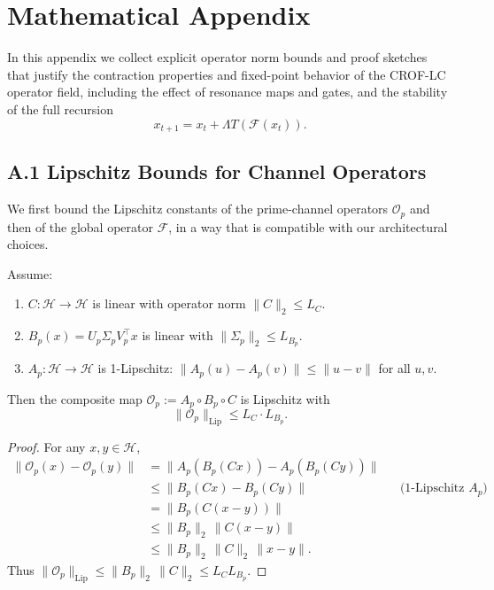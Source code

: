 \documentclass[11pt]{article}
\begin{document}
\section*{Mathematical Appendix}


In this appendix we collect explicit operator norm bounds and proof sketches that justify the contraction properties and fixed-point behavior of the CROF-LC operator field, including the effect of resonance maps and gates, and the stability of the full recursion
\[
  x_{t+1} = x_t + \Lambda T(\mathcal{F}(x_t)).
\]

\subsection*{A.1 Lipschitz Bounds for Channel Operators}

We first bound the Lipschitz constants of the prime-channel operators \(\mathcal{O}_p\) and then of the global operator \(\mathcal{F}\), in a way that is compatible with our architectural choices.

\begin{theorem}
Assume:
\begin{enumerate}[label=(\roman*),leftmargin=*]
  \item \(C : \mathcal{H} \to \mathcal{H}\) is linear with operator norm \(\|C\|_2 \leq L_C\).
  \item \(B_p(x) = U_p \Sigma_p V_p^\top x\) is linear with \(\|\Sigma_p\|_2 \leq L_{B_p}\).
  \item \(A_p : \mathcal{H} \to \mathcal{H}\) is 1-Lipschitz:
        \(\|A_p(u) - A_p(v)\| \leq \|u - v\|\) for all \(u,v\).
\end{enumerate}
Then the composite map \(\mathcal{O}_p := A_p \circ B_p \circ C\) is Lipschitz with
\[
  \|\mathcal{O}_p\|_{\mathrm{Lip}} \leq L_C \cdot L_{B_p}.
\]
\end{theorem}

\begin{proof}
For any \(x,y \in \mathcal{H}\),
\begin{align*}
  \|\mathcal{O}_p(x) - \mathcal{O}_p(y)\|
  &= \|A_p(B_p(Cx)) - A_p(B_p(Cy))\| \\
  &\leq \|B_p(Cx) - B_p(Cy)\|
     && \text{(1-Lipschitz \(A_p\))} \\
  &= \|B_p(C(x-y))\| \\
  &\leq \|B_p\|_2 \,\|C(x-y)\| \\
  &\leq \|B_p\|_2 \,\|C\|_2 \,\|x-y\|.
\end{align*}
Thus \(\|\mathcal{O}_p\|_{\mathrm{Lip}} \leq \|B_p\|_2 \,\|C\|_2 \leq L_C L_{B_p}\).
\end{proof}
\end{document}
